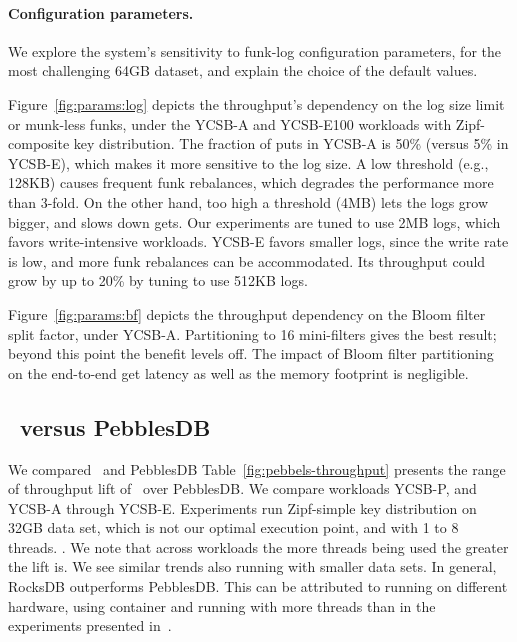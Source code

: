 \paragraph{Configuration parameters.} 
We explore the system's  sensitivity to funk-log configuration parameters, for the most challenging 64GB dataset, 
and explain the choice of the default values.

Figure~\ref{fig:params:log} depicts the throughput's dependency on the log size limit or munk-less funks, 
under the YCSB-A and YCSB-E100 workloads with Zipf-composite key distribution. 
The fraction of puts in YCSB-A is 50\% (versus 5\% in YCSB-E), which makes it more sensitive to the log size. 
A low threshold (e.g., 128KB) causes frequent funk rebalances, which degrades the performance more than 3-fold. 
On the other hand, too high a threshold (4MB) lets the logs grow bigger, and slows down gets. Our experiments are 
tuned to use 2MB logs, which favors write-intensive workloads. YCSB-E favors smaller logs, since the write 
rate is low, and more funk rebalances can be accommodated. Its throughput could grow by up to 20\% by tuning to
use 512KB logs.

Figure~\ref{fig:params:bf} depicts the throughput dependency on the Bloom filter split factor, under YCSB-A. 
Partitioning to 16 mini-filters gives the best result; beyond this point the benefit levels off. 
The impact of Bloom filter partitioning on the end-to-end get latency as well as the memory footprint is negligible.

\subsection{\sys\ versus PebblesDB}
\label{ssec:pebbles} 

We compared \sys\ and PebblesDB 
Table~\ref{fig:pebbels-throughput} presents the range of throughput lift of \sys\ over PebblesDB. 
We compare workloads YCSB-P, and YCSB-A through YCSB-E. Experiments run Zipf-simple key distribution on 32GB data set, which is not our optimal execution point, and with 1 to 8 threads.
 .
We note that across workloads the more threads being used the greater the lift is. We see similar trends also running with smaller data sets.
In general, RocksDB outperforms PebblesDB. This can be attributed to running on different hardware, using container and running with more threads than in the experiments presented in~\cite{PebblesDB}.


